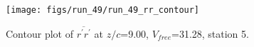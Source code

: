 \begin{figure}[H]
\centering
\texttt{[image: figs/run\_49/run\_49\_rr\_contour]}
\caption{Contour plot of $\overline{r^\prime r^\prime}$ at $z/c$=9.00, $V_{free}$=31.28, station 5.}
\end{figure}


